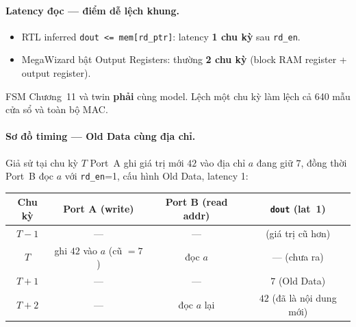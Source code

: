 \paragraph{Latency đọc --- điểm dễ lệch khung.}
\begin{itemize}[leftmargin=1.4em]
  \item RTL inferred \texttt{dout <= mem[rd\_ptr]}: latency \textbf{1 chu kỳ} sau \texttt{rd\_en}.
  \item MegaWizard bật Output Registers: thường \textbf{2 chu kỳ} (block RAM register + output register).
\end{itemize}
FSM Chương~11 và twin \textbf{phải} cùng model. Lệch một chu kỳ làm lệch cả 640 mẫu cửa sổ và toàn bộ MAC.

\paragraph{Sơ đồ timing --- Old Data cùng địa chỉ.} Giả sử tại chu kỳ $T$ Port~A ghi giá trị mới $42$ vào địa chỉ $a$ đang giữ $7$, đồng thời Port~B đọc $a$ với \texttt{rd\_en}=1, cấu hình Old Data, latency 1:

\begin{center}\small
\begin{tabular}{@{}cccc@{}}
\toprule
Chu kỳ & Port A (write) & Port B (read addr) & \texttt{dout} (lat~1) \\
\midrule
$T-1$ & --- & --- & (giá trị cũ hơn) \\
$T$ & ghi $42$ vào $a$ (cũ $=7$) & đọc $a$ & --- (chưa ra) \\
$T+1$ & --- & --- & $7$ (Old Data) \\
$T+2$ & --- & đọc $a$ lại & $42$ (đã là nội dung mới) \\
\bottomrule
\end{tabular}
\end{center}

